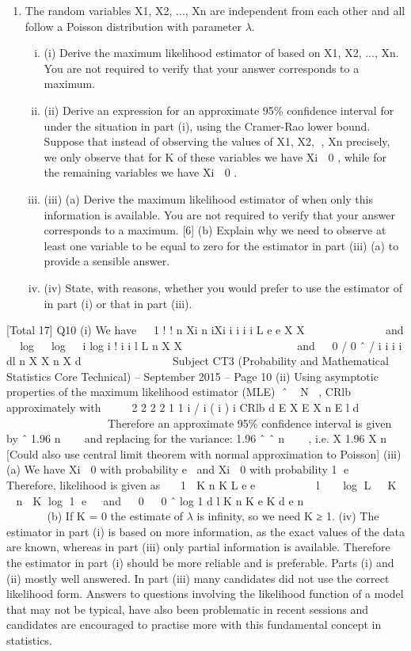\documentclass[a4paper,12pt]{article}
\begin{document}
\begin{enumerate}
\item The random variables X1, X2, ..., Xn are independent from each other and all follow a
Poisson distribution with parameter $\lambda$.
\begin{enumerate}[(i)]
\item (i) Derive the maximum likelihood estimator of \lambda based on X1, X2, ..., Xn. You
are not required to verify that your answer corresponds to a maximum. 
\item (ii) Derive an expression for an approximate 95\% confidence interval for \lambda under
the situation in part (i), using the Cramer-Rao lower bound. 
Suppose that instead of observing the values of X1, X2, , Xn precisely, we only
observe that for K of these variables we have Xi  0 , while for the remaining
variables we have Xi  0 .
\item (iii) (a) Derive the maximum likelihood estimator of \lambda when only this
information is available. You are not required to verify that your
answer corresponds to a maximum. [6]
(b) Explain why we need to observe at least one variable to be equal to
zero for the estimator in part (iii) (a) to provide a sensible answer. 
\item (iv) State, with reasons, whether you would prefer to use the estimator of \lambda in part
(i) or that in part (iii). 
\end{enumerate}
\end{enumerate}
[Total 17]
  Q10 (i) We have
 
1
! !
  n Xi n iXi
i i i i
L e e
X X
  

 
    and
  log   log   i log i !
  i i
l L n X X
 
        
 
 
and   0 / 0 ˆ / i i
i i
dl n X X n X
d
        
  
Subject CT3 (Probability and Mathematical Statistics Core Technical) – September 2015 – %
Page 10
(ii) Using asymptotic properties of the maximum likelihood estimator (MLE)
ˆ ~ N , CRlb approximately
with
   
2
2 2
2
1 1
i / i ( i ) i
CRlb
d E X E X n E l
d
 
     
         
 
Therefore an approximate 95\% confidence interval is given by ˆ 1.96
n

 
and replacing for the variance: 1.96
ˆ ˆ
n

  , i.e. X 1.96 X
n

[Could also use central limit theorem with normal approximation to Poisson]
(iii) (a) We have Xi  0 with probability e and Xi  0 with probability
1 e
Therefore, likelihood is given as
  1 
K n K L e e

      
l   log L  K  n  K log 1 e 
and
  0   0 ˆ log
1
d l K n K e K
d e n


               
(b) If K = 0 the estimate of $\lambda$ is infinity, so we need K ≥ 1.
(iv) The estimator in part (i) is based on more information, as the exact values of
the data are known, whereas in part (iii) only partial information is available.
Therefore the estimator in part (i) should be more reliable and is preferable.
Parts (i) and (ii) mostly well answered. In part (iii) many candidates did not
use the correct likelihood form. Answers to questions involving the likelihood
function of a model that may not be typical, have also been problematic in
recent sessions and candidates are encouraged to practise more with this
fundamental concept in statistics.
\end{document}
